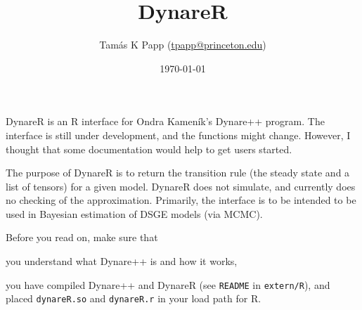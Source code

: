 \documentclass[12pt,a4paper]{article}
\begin{document}
\title{DynareR}
\author{Tam\'as K Papp (\url{tpapp@princeton.edu})}
\date{\today}
\maketitle

DynareR is an R interface for Ondra Kamen\'ik's Dynare++ program.  The
interface is still under development, and the functions might change.
However, I thought that some documentation would help to get users
started.

The purpose of DynareR is to return the transition rule (the
steady state and a list of tensors) for a given model.  DynareR
does not simulate, and currently does no checking of the
approximation.  Primarily, the interface is to be intended to be used
in Bayesian estimation of DSGE models (via MCMC).

Before you read on, make sure that
\begin{compactitem}
  \item you understand what Dynare++ is and how it works,
  \item you have compiled Dynare++ and DynareR (see \verb!README! in
    \verb!extern/R!), and placed \verb!dynareR.so! and
    \verb!dynareR.r! in your load path for R.
\end{compactitem}
\end{document}
